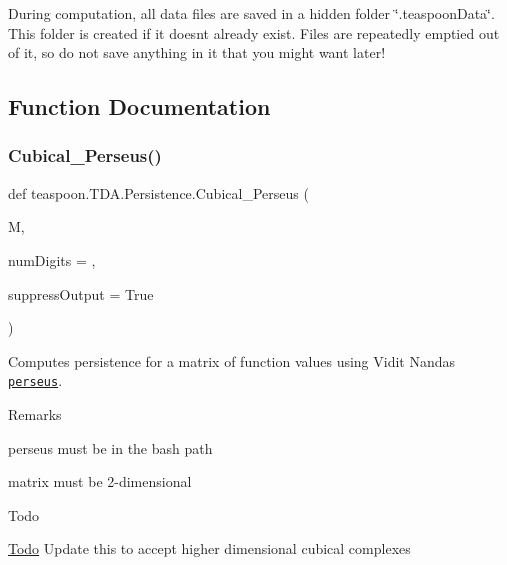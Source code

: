 During computation, all data files are saved in a hidden folder \char`\"{}.\+teaspoon\+Data\char`\"{}. This folder is created if it doesn\textquotesingle{}t already exist. Files are repeatedly emptied out of it, so do not save anything in it that you might want later! 

\subsection{Function Documentation}
\mbox{\label{namespaceteaspoon_1_1_t_d_a_1_1_persistence_aa583aa9a694aeaa3983e77319ac68e84}} 
\subsubsection{\texorpdfstring{Cubical\+\_\+\+Perseus()}{Cubical\_Perseus()}}
{\footnotesize\ttfamily def teaspoon.\+T\+D\+A.\+Persistence.\+Cubical\+\_\+\+Perseus (\begin{DoxyParamCaption}\item[{}]{M,  }\item[{}]{num\+Digits = {},  }\item[{}]{suppress\+Output = {\ttfamily True} }\end{DoxyParamCaption})}



Computes persistence for a matrix of function values using Vidit Nanda\textquotesingle{}s \href{http://people.maths.ox.ac.uk/nanda/perseus/index.html}{\tt perseus}. 

\begin{DoxyRemark}{Remarks}

\begin{DoxyItemize}
\item perseus must be in the bash path
\item matrix must be 2-\/dimensional
\end{DoxyItemize}
\end{DoxyRemark}
\begin{DoxyRefDesc}{Todo}
\item[\hyperlink{todo__todo000005}{Todo}]Update this to accept higher dimensional cubical complexes\end{DoxyRefDesc}



